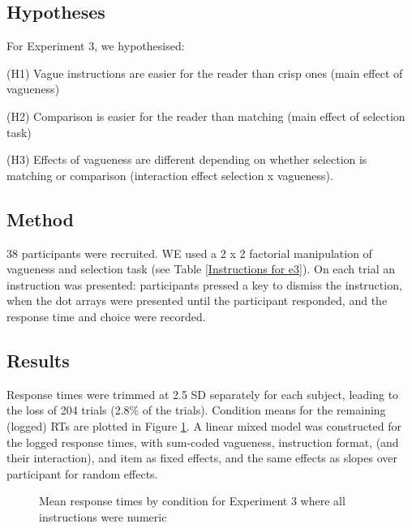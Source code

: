 \documentclass[%
man,		%
floatsintext,%
apacite%
]{apa6}
\begin{document}
\subsection{Hypotheses} %
\noindent For Experiment 3, we hypothesised:
{\small
\begin{APAenumerate}
	\item [(H1)] Vague instructions are easier for the reader than crisp ones (main effect of vagueness)
	\item [(H2)] Comparison is easier for the reader than matching (main effect of selection task)
	\item [(H3)] Effects of vagueness are different depending on whether selection is matching or comparison (interaction effect selection x vagueness).
\end{APAenumerate}
}

\subsection{Method} %

38 participants were recruited. WE used a 2 x 2 factorial manipulation of vagueness and selection task (see Table \ref{Instructions for e3}).
On each trial an instruction was presented: participants pressed a key to dismiss the instruction, when the dot arrays were presented until the participant responded, and the response time and choice were recorded.

\subsection{Results} %

Response times were trimmed at 2.5 SD separately for each subject, leading to the loss of 204 trials (2.8\% of the trials).
Condition means for the remaining (logged) RTs are plotted in Figure \ref{resultse3}.
A linear mixed model was constructed for the logged response times, 
with sum-coded vagueness, instruction format, (and their interaction), and item as fixed effects, and the same effects as slopes over participant for random effects.

\begin{figure}[htbp]
\centering
{}
\caption{Mean response times by condition for Experiment 3 where all instructions were numeric}
\label{resultse3}
\end{figure}
\end{document}
